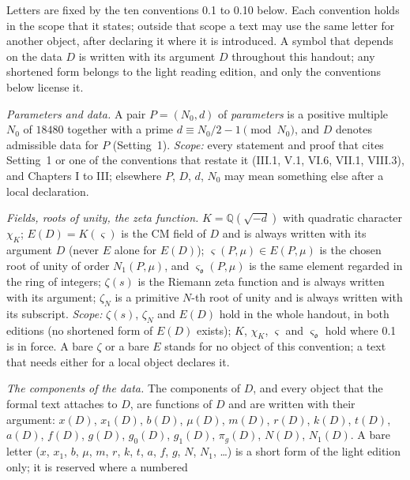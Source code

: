  Letters are fixed by the ten conventions 0.1 to 0.10 below. Each convention holds in the
scope that it states; outside that scope a text may use the same letter for another object, after declaring it where it
is introduced. A symbol that depends on the data $D$ is written with its argument $D$ throughout this handout; any
shortened form belongs to the light reading edition, and only the conventions below license it.
\begin{description}[font=\bfseries,leftmargin=2.6em,labelwidth=2.2em,itemsep=0.1em,topsep=0.2em,parsep=0.1em]
\item[0.1] \emph{Parameters and data.} A pair $P=(N_0,d)$ of \emph{parameters} is a positive multiple $N_0$ of $18480$
together with a prime $d\equiv N_0/2-1\pmod{N_0}$, and $D$ denotes admissible data for $P$ (Setting~1).
\emph{Scope:} every statement and proof that cites Setting~1 or one of the conventions that restate it (III.1, V.1, VI.6,
VII.1, VIII.3), and Chapters I to III; elsewhere $P$, $D$, $d$, $N_0$ may mean something else after a local declaration.
\item[0.2] \emph{Fields, roots of unity, the zeta function.} $K=\mathbb{Q}(\sqrt{-d})$ with quadratic character $\chi_K$;
$E(D)=K(\varsigma)$ is the CM field of $D$ and is always written with its argument $D$ (never $E$ alone for $E(D)$);
$\varsigma(P,\mu)\in E(P,\mu)$ is the chosen root of unity of order $N_1(P,\mu)$, and $\varsigma_{\mathfrak{o}}(P,\mu)$ is
the same element regarded in the ring of integers; $\zeta(s)$ is the Riemann zeta function and is always written with its
argument; $\zeta_N$ is a primitive $N$-th root of unity and is always written with its subscript.
\emph{Scope:} $\zeta(s)$, $\zeta_N$ and $E(D)$ hold in the whole handout, in both editions (no shortened form of $E(D)$
exists); $K$, $\chi_K$, $\varsigma$ and $\varsigma_{\mathfrak{o}}$ hold where 0.1 is in force. A bare $\zeta$ or a bare $E$
stands for no object of this convention; a text that needs either for a local object declares it.
\item[0.3] \emph{The components of the data.} The components of $D$, and every object that the formal text attaches to $D$,
are functions of $D$ and are written with their argument: $x(D)$, $x_1(D)$, $b(D)$, $\mu(D)$, $m(D)$, $r(D)$, $k(D)$, $t(D)$,
$a(D)$, $f(D)$, $g(D)$, $g_0(D)$, $g_1(D)$, $\pi_g(D)$, $N(D)$, $N_1(D)$. A bare letter ($x$, $x_1$, $b$, $\mu$, $m$, $r$,
$k$, $t$, $a$, $f$, $g$, $N$, $N_1$, \dots) is a short form of the light edition only; it is reserved where a numbered

\end{description}
